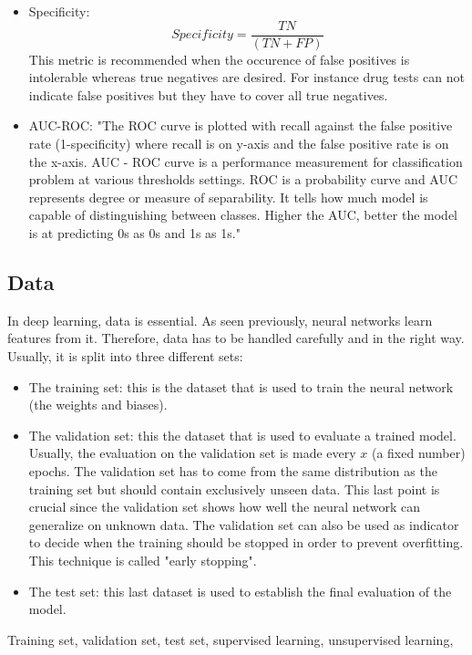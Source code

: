 \begin{itemize}
\item Specificity:
\begin{equation}
Specificity = \frac{TN}{(TN + FP)}
\end{equation}
This metric is recommended when the occurence of false positives is intolerable whereas true negatives are desired. For instance drug tests can not indicate false positives but they have to cover all true negatives.
\item AUC-ROC:
"The ROC curve is plotted with recall against the false positive rate (1-specificity) where recall is on y-axis and the false positive rate is on the x-axis. AUC - ROC curve is a performance measurement for classification problem at various thresholds settings. ROC is a probability curve and AUC represents degree or measure of separability. It tells how much model is capable of distinguishing between classes. Higher the AUC, better the model is at predicting 0s as 0s and 1s as 1s\cite{26}."

\end{itemize}




\subsection{Data}
In deep learning, data is essential. As seen previously, neural networks learn features from it. Therefore, data has to be handled carefully and in the right way. Usually, it is split into three different sets:
\begin{itemize}
\item The training set: this is the dataset that is used to train the neural network (the weights and biases).
\item The validation set: this the dataset that is used to evaluate a trained model.  Usually, the evaluation on the validation set is made every $x$ (a fixed number) epochs. The validation set has to come from the same distribution as the training set but should contain exclusively unseen data. This last point is crucial since the validation set shows how well the neural network can generalize on unknown data. The validation set can also be used as indicator to decide when the training should be stopped in order to prevent overfitting. This technique is called "early stopping".
\item The test set: this last dataset is used to establish the final evaluation of the model.

\end{itemize}
Training set, validation set, test set, supervised learning, unsupervised learning,

